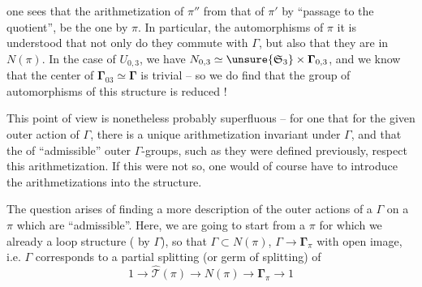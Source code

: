 
one sees that the arithmetization of $\pi''$  from that of $\pi'$ by ``passage to the quotient'', be the one  by $\pi$.  In particular,  the automorphisms of $\pi$ it is understood that  not only do they commute with $\Gamma$, but also that they are in $N(\pi)$.  In the case of $U_{0,3}$, we have $N_{0,3}\simeq\unsure{\mathfrak S_3}\times\boldsymbol{\Gamma}_{0,3}$, and we know that the center of $\boldsymbol{\Gamma}_{03}\simeq\boldsymbol{\Gamma}$ is trivial -- so we do find that the group of automorphisms of this structure is reduced  !

This point of view is nonetheless probably superfluous -- for one  that for the given outer action of $\Gamma$, there is a unique arithmetization invariant under $\Gamma$, and that the   of ``admissible'' outer $\Gamma$-groups, such as they were defined previously,  respect this arithmetization. If this were not so, one would of course have to introduce the arithmetizations into the structure.




The question arises of finding a more   description of the outer actions of a $\Gamma$ on a $\pi$ which are ``admissible''.  Here, we are going to start from a $\pi$ for which we already  a loop structure  ( by $\Gamma$), so  that $\Gamma\subset N(\pi)$, $\Gamma\longrightarrow\boldsymbol{\Gamma}_\pi$  with open image,  i.e. $\Gamma$ corresponds to a partial splitting (or germ of splitting) of 
\[
1\longrightarrow\widehat{\mathcal T}(\pi)\longrightarrow N(\pi)\longrightarrow\boldsymbol{\Gamma}_\pi\longrightarrow1
\]

